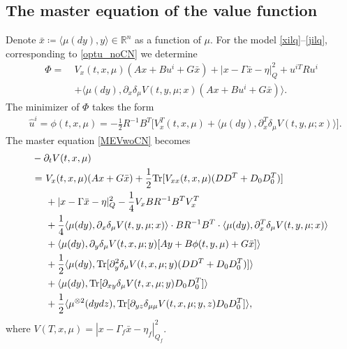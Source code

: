\documentclass{amsart}
\theoremstyle{definition}
\theoremstyle{remark}
\numberwithin{equation}{section}
\begin{document}
\subsection{The master equation of the value function} \label{sec:sub:lqme}
Denote $\bar x \coloneqq \langle  \mu(dy),y \rangle\in \mathbb{R}^n $ as a function of $\mu$.
For the model \eqref{xilq}--\eqref{jilq}, corresponding to \eqref{optu_noCN} we determine
\begin{align*}
\Phi =\   &  V_x (t, x, \mu)(Ax+Bu^i+G\bar x)+   |x-\Gamma \bar x-\eta|_Q^2 + u^{iT}R u^i\\
&+\langle \mu(dy), \partial_{x}\delta_\mu V (t, y, \mu; x) (Ax+Bu^i+G\bar x)    \rangle.
\end{align*}
The minimizer of $\Phi$ takes the form
\begin{align}
&\hat u^i =\phi(t,x, \mu)= -\frac{1}{2} R^{-1}B^T \big[ V_x^T(t,x,\mu)+\langle \mu(dy),  \partial^T_{x}\delta_\mu V(t,y,\mu; x)\rangle \big].\nonumber
\end{align}
The master equation \eqref{MEVwoCN} becomes
\begin{align*}
&\hskip -0.5cm-\partial_t V(t, x, \mu)\\
=\ &  V_x(t, x, \mu) (Ax+G\bar x)
 +\frac{1}{2} {\rm Tr} [ V_{xx}(t,x,\mu) (DD^T+D_0D_0^T)]\\
& + |x-\Gamma \bar x-\eta|_Q^2 -\frac{1}{4}  V_{x}BR^{-1}B^T  V_{x}^T\\
&+\frac{1}{4} \langle \mu(dy),   \partial_{x}\delta_\mu V(t,y,\mu; x)\rangle \cdot BR^{-1}B^T
\cdot\langle\mu(dy),  \partial^T_{x}\delta_\mu V(t,y,\mu; x)\rangle  \\
& +\langle \mu(dy),   \partial_y\delta_\mu V(t,x,\mu; y) [Ay+B\phi(t,y,\mu)+G\bar x]\rangle \\
&+\frac{1}{2}\langle \mu(dy), {\rm Tr} [\partial_{y}^2 \delta_\mu V(t,x,\mu; y)
(DD^T+D_0D_0^T) ]\rangle \\
& +\langle \mu(dy),  {\rm Tr} [ \partial_{xy}\delta_\mu V(t,x, \mu;y) D_0D_0^T ]\rangle \notag  \\
&+\frac{1}{2}\langle \mu^{\otimes2}(dydz), {\rm Tr}[\partial_{yz}\delta_{\mu\mu} V (t, x, \mu; y,z)
D_0D_0^T]\rangle,\notag
\end{align*}
where $V(T, x,\mu)=|x-\Gamma_f \bar x -\eta_f|_{Q_f}^2$.
\end{document}

